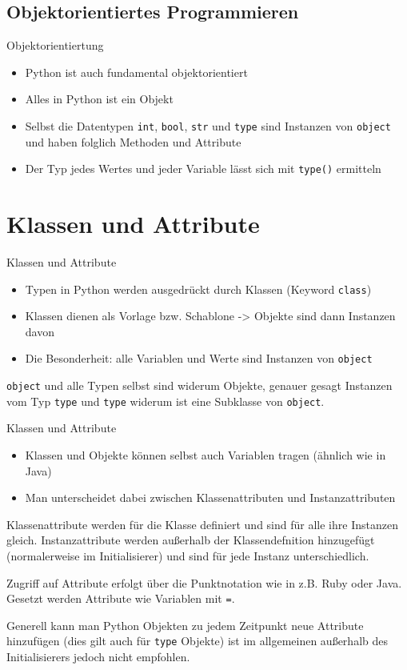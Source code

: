 \subsection{Objektorientiertes Programmieren}
\begin{frame}[fragile]{Objektorientiertung}
	\begin{itemize}
		\item Python ist auch fundamental objektorientiert
		\item Alles in Python ist ein Objekt
		\item Selbst die Datentypen \texttt{int}, \texttt{bool}, \texttt{str} und \texttt{type} sind Instanzen von \texttt{object} und haben folglich Methoden und Attribute
		\item Der Typ jedes Wertes und jeder Variable lässt sich mit \texttt{type()} ermitteln
	\end{itemize}
\end{frame}

\section{Klassen und Attribute}
\begin{frame}[fragile]{Klassen und Attribute}
	\begin{itemize}
		\item Typen in Python werden ausgedrückt durch Klassen (Keyword \texttt{class})
		\item Klassen dienen als Vorlage bzw. Schablone -> Objekte sind dann Instanzen davon
		\item Die Besonderheit: alle Variablen und Werte sind Instanzen von \texttt{object}
	\end{itemize}
	\texttt{object} und alle Typen selbst sind widerum Objekte, genauer gesagt Instanzen vom Typ \texttt{type} und \texttt{type} widerum ist eine Subklasse von \texttt{object}.
\end{frame}

\begin{frame}[fragile]{Klassen und Attribute}
	\begin{itemize}
		\item Klassen und Objekte können selbst auch Variablen tragen (ähnlich wie in Java)
		\item Man unterscheidet dabei zwischen Klassenattributen und Instanzattributen
	\end{itemize}
Klassenattribute werden für die Klasse definiert und sind für alle ihre Instanzen gleich. Instanzattribute werden außerhalb der Klassendefnition hinzugefügt (normalerweise im Initialisierer) und sind für jede Instanz unterschiedlich.

Zugriff auf Attribute erfolgt über die Punktnotation wie in z.B. Ruby oder Java. Gesetzt werden Attribute wie Variablen mit \texttt{=}.

Generell kann man Python Objekten zu jedem Zeitpunkt neue Attribute hinzufügen (dies gilt auch für \texttt{type} Objekte) ist im allgemeinen außerhalb des Initialisierers jedoch nicht empfohlen.

\end{frame}


